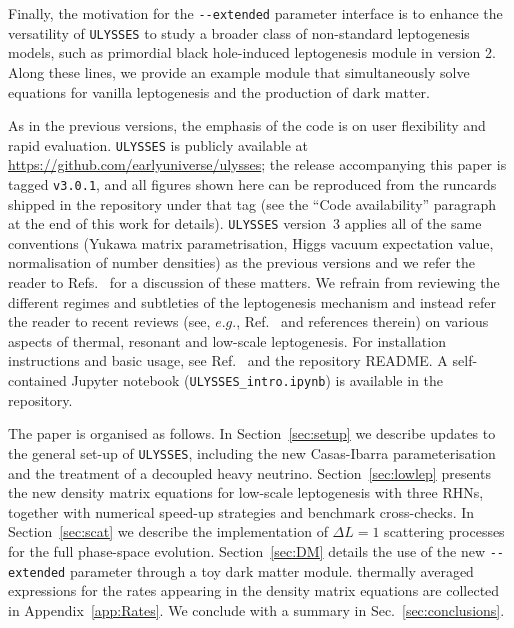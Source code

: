 \documentclass[12pt, a4paper]{article}
\newcommand{\virg}[1]{``#1''}
\begin{document}
 Finally, the motivation for the \texttt{-{}-extended} parameter interface is to enhance the versatility of \texttt{ULYSSES} to study a broader class of non-standard leptogenesis models, such as primordial black hole-induced leptogenesis module in version 2. Along these lines, we provide an example module that simultaneously solve equations for vanilla leptogenesis and the
production of dark matter.


As in the previous versions, the emphasis of the code is on user flexibility and rapid
evaluation. \texttt{ULYSSES} is publicly available at
\href{https://github.com/earlyuniverse/ulysses}{https://github.com/earlyuniverse/ulysses}; the release accompanying this paper is tagged \texttt{v3.0.1}, and all figures shown here can be reproduced from the runcards shipped in the repository under that tag (see the \virg{Code availability} paragraph at the end of this work for details).
\texttt{ULYSSES} version~3 applies all of the same conventions (Yukawa matrix
parametrisation, Higgs vacuum expectation value, normalisation of number densities) as
the previous versions and we refer the reader to Refs.~\cite{Granelli:2020pim,
Granelli:2023vcm} for a discussion of these matters. We refrain from reviewing the
different regimes and subtleties of the leptogenesis mechanism and instead refer the
reader to recent reviews (see, $e.g.$, Ref.~\cite{Bodeker:2020ghk} and references therein) on various
aspects of thermal, resonant and low-scale leptogenesis. For installation instructions and basic usage, see Ref.~\cite{Granelli:2020pim} and the repository README. A self-contained Jupyter notebook (\texttt{ULYSSES\_intro.ipynb}) is available in the repository.

The paper is organised as follows. In Section~\ref{sec:setup} we describe updates to
the general set-up of \texttt{ULYSSES}, including the new Casas-Ibarra parameterisation
and the treatment of a decoupled heavy neutrino. Section~\ref{sec:lowlep} presents the new
density matrix equations for low-scale leptogenesis with three RHNs, together with
numerical speed-up strategies and benchmark cross-checks. In
Section~\ref{sec:scat} we describe the implementation of $\Delta L = 1$ scattering
processes for the full phase-space evolution. Section~\ref{sec:DM} details the use of the new \texttt{-{}-extended} parameter through a toy dark matter module. thermally averaged expressions for the rates appearing in the density
matrix equations are collected in Appendix~\ref{app:Rates}. We conclude with a summary in Sec.~\ref{sec:conclusions}.
\end{document}
